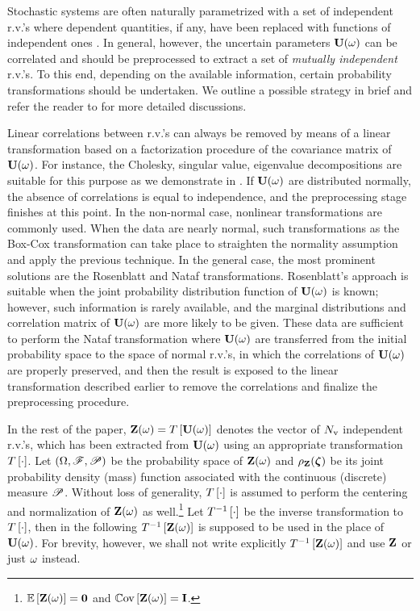 Stochastic systems are often naturally parametrized with a set of independent r.v.'s where dependent quantities, if any, have been replaced with functions of independent ones \cite{xiu2009}. In general, however, the uncertain parameters $\mathbf{U}(\omega)$ can be correlated and should be preprocessed to extract a set of \emph{mutually independent} r.v.'s. To this end, depending on the available information, certain probability transformations should be undertaken. We outline a possible strategy in brief and refer the reader to \cite{eldred2009, xiu2009} for more detailed discussions.

Linear correlations between r.v.'s can always be removed by means of a linear transformation based on a factorization procedure of the covariance matrix of $\mathbf{U}(\omega)$. For instance, the Cholesky, singular value, eigenvalue decompositions \cite{press2007} are suitable for this purpose as we demonstrate in . If $\mathbf{U}(\omega)$ are distributed normally, the absence of correlations is equal to independence, and the preprocessing stage finishes at this point. In the non-normal case, nonlinear transformations are commonly used. When the data are nearly normal, such transformations as the Box-Cox transformation \cite{box1964} can take place to straighten the normality assumption and apply the previous technique. In the general case, the most prominent solutions are the Rosenblatt \cite{rosenblatt1952} and Nataf \cite{hongshuang2008} transformations. Rosenblatt's approach is suitable when the joint probability distribution function of $\mathbf{U}(\omega)$ is known; however, such information is rarely available, and the marginal distributions and correlation matrix of $\mathbf{U}(\omega)$ are more likely to be given. These data are sufficient to perform the Nataf transformation where $\mathbf{U}(\omega)$ are transferred from the initial probability space to the space of normal r.v.'s, in which the correlations of $\mathbf{U}(\omega)$ are properly preserved, and then the result is exposed to the linear transformation described earlier to remove the correlations and finalize the preprocessing procedure.

In the rest of the paper, $\mathbf{Z}(\omega) = T\left[\mathbf{U}(\omega)\right]$ denotes the vector of ${N_\text{v}}$ independent r.v.'s, which has been extracted from $\mathbf{U}(\omega)$ using an appropriate transformation $T\left[\cdot\right]$. Let $(\Omega, \mathscr{F}, \mathscr{P})$ be the probability space of $\mathbf{Z}(\omega)$ and $\rho_{\mathbf{Z}}(\boldsymbol{\zeta})$ be its joint probability density (mass) function associated with the continuous (discrete) measure $\mathscr{P}$. Without loss of generality, $T\left[\cdot\right]$ is assumed to perform the centering and normalization of $\mathbf{Z}(\omega)$ as well.\footnote{$\oExp{\vZ(\o)} = \mZero$ and $\oCov{\vZ(\o)} = \mI$.} Let $T^{-1}\left[\cdot\right]$ be the inverse transformation to $T\left[\cdot\right]$, then in the following $T^{-1}\left[\mathbf{Z}(\omega)\right]$ is supposed to be used in the place of $\mathbf{U}(\omega)$. For brevity, however, we shall not write explicitly $T^{-1}\left[\mathbf{Z}(\omega)\right]$ and use $\mathbf{Z}$ or just $\omega$ instead.
